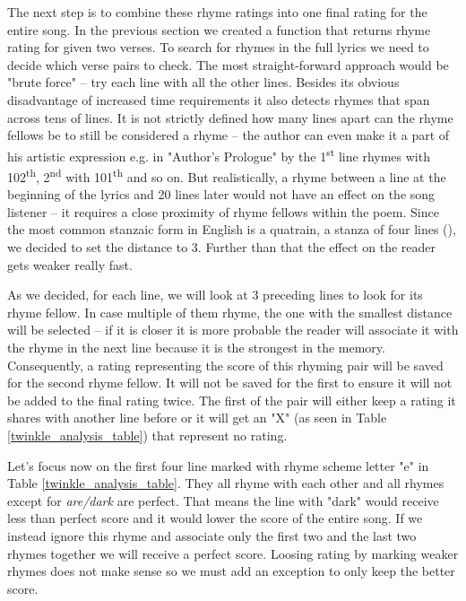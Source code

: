 The next step is to combine these rhyme ratings into one final rating for the entire song. In the previous section we created a function that returns rhyme rating for given two verses. To search for rhymes in the full lyrics we need to decide which verse pairs to check. The most straight-forward approach would be "brute force" -- try each line with all the other lines. Besides its obvious disadvantage of increased time requirements it also detects rhymes that span across tens of lines. It is not strictly defined how many lines apart can the rhyme fellows be to still be considered a rhyme -- the author can even make it a part of his artistic expression  e.g. in "Author's Prologue" by \cite{thomas1952author} the 1\textsuperscript{st} line rhymes with 102\textsuperscript{th}, 2\textsuperscript{nd} with 101\textsuperscript{th} and so on. But realistically, a rhyme between a line at the beginning of the lyrics and 20 lines later would not have an effect on the song listener -- it requires a close proximity of rhyme fellows within the poem. Since the most common stanzaic form in English is a quatrain, a stanza of four lines (\cite{eastman1970norton}), we decided to set the distance to 3. Further than that the effect on the reader gets weaker really fast. 

As we decided, for each line, we will look at 3 preceding lines to look for its rhyme fellow. In case multiple of them rhyme, the one with the smallest distance will be selected -- if it is closer it is more probable the reader will associate it with the rhyme in the next line because it is the strongest in the memory. Consequently, a rating representing the score of this rhyming pair will be saved for the second rhyme fellow. It will not be saved for the first to ensure it will not be added to the final rating twice. The first of the pair will either keep a rating it shares with another line before or it will get an "X" (as seen in Table \ref{twinkle_analysis_table}) that represent no rating. 

Let's focus now on the first four line marked with rhyme scheme letter "e" in Table \ref{twinkle_analysis_table}. They all rhyme with each other and all rhymes except for \textit{are/dark} are perfect. That means the line with "dark" would receive less than perfect score and it would lower the score of the entire song. If we instead ignore this rhyme and associate only the first two and the last two rhymes together we will receive a perfect score. Loosing rating by marking weaker rhymes does not make sense so we must add an exception to only keep the better score.

